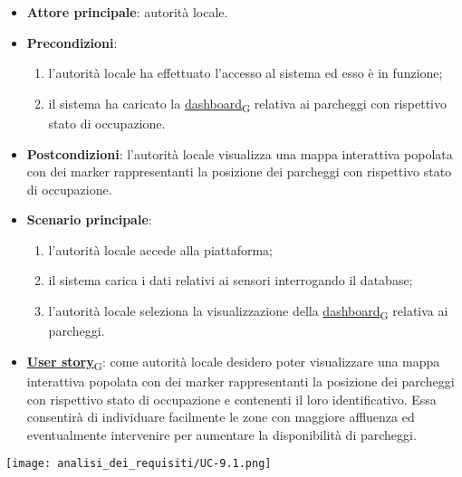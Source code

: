 \begin{itemize}
	\item \textbf{Attore principale}: autorità locale.
	\item \textbf{Precondizioni}:
	      \begin{enumerate}
		      \item l'autorità locale ha effettuato l'accesso al sistema ed esso è in funzione;
		      \item il sistema ha caricato la \href{https://7last.github.io/docs/rtb/documentazione-interna/glossario\#dashboard}{dashboard\textsubscript{G}} relativa ai parcheggi con rispettivo stato di occupazione.
	      \end{enumerate}
	\item \textbf{Postcondizioni}: l'autorità locale visualizza una mappa interattiva popolata con dei marker rappresentanti la posizione dei parcheggi con rispettivo stato di occupazione.
	\item \textbf{Scenario principale}:
	      \begin{enumerate}
		      \item l'autorità locale accede alla piattaforma;
		      \item il sistema carica i dati relativi ai sensori interrogando il database;
		      \item l'autorità locale seleziona la visualizzazione della \href{https://7last.github.io/docs/rtb/documentazione-interna/glossario\#dashboard}{dashboard\textsubscript{G}} relativa ai parcheggi.
	      \end{enumerate}
	\item \href{https://7last.github.io/docs/rtb/documentazione-interna/glossario\#user-story}{\textbf{User story}\textsubscript{G}}:
	      come autorità locale desidero poter visualizzare una mappa interattiva popolata con dei marker rappresentanti la posizione dei parcheggi con rispettivo stato di occupazione
	      e contenenti il loro identificativo. Essa consentirà di individuare facilmente le zone con maggiore affluenza ed eventualmente intervenire per aumentare la disponibilità di parcheggi.
\end{itemize}
\begin{center}
	\texttt{[image: analisi\_dei\_requisiti/UC-9.1.png]}
\end{center}

